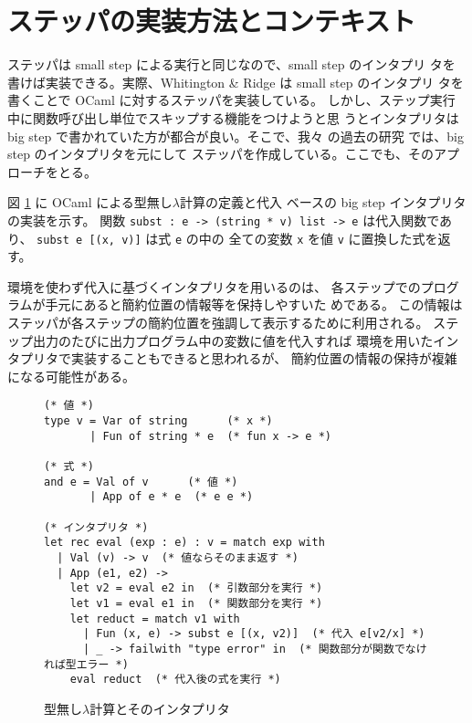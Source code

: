 \section{ステッパの実装方法とコンテキスト}
\label{section:context}

ステッパは small step による実行と同じなので、small step のインタプリ
タを書けば実装できる。実際、Whitington \& Ridge \cite{EPTCS294.3} は small step のインタプリ
タを書くことで OCaml に対するステッパを実装している。
しかし、ステップ実行中に関数呼び出し単位でスキップする機能をつけようと思
うとインタプリタは big step で書かれていた方が都合が良い。そこで、我々
の過去の研究 \cite{FCA19} では、big step のインタプリタを元にして
ステッパを作成している。ここでも、そのアプローチをとる。

図 \ref{figure:lambda} に OCaml による型無し$\lambda$計算の定義と代入
ベースの big step インタプリタの実装を示す。
関数 \texttt{subst :\ e -> (string * v) list -> e} は代入関数であり、
\texttt{subst e [(x, v)]} は式 \texttt{e} の中の
全ての変数 \texttt{x} を値 \texttt{v} に置換した式を返す。

環境を使わず代入に基づくインタプリタを用いるのは、
各ステップでのプログラムが手元にあると簡約位置の情報等を保持しやすいた
めである。
この情報はステッパが各ステップの簡約位置を強調して表示するために利用される。
ステップ出力のたびに出力プログラム中の変数に値を代入すれば
環境を用いたインタプリタで実装することもできると思われるが、
簡約位置の情報の保持が複雑になる可能性がある。


\begin{figure}
\begin{spacing}{0.9} 
\begin{verbatim}
(* 値 *)
type v = Var of string      (* x *)
       | Fun of string * e  (* fun x -> e *)

(* 式 *)
and e = Val of v      (* 値 *)
       | App of e * e  (* e e *)

(* インタプリタ *)
let rec eval (exp : e) : v = match exp with
  | Val (v) -> v  (* 値ならそのまま返す *)
  | App (e1, e2) ->
    let v2 = eval e2 in  (* 引数部分を実行 *)
    let v1 = eval e1 in  (* 関数部分を実行 *)
    let reduct = match v1 with
      | Fun (x, e) -> subst e [(x, v2)]  (* 代入 e[v2/x] *)
      | _ -> failwith "type error" in  (* 関数部分が関数でなければ型エラー *)
    eval reduct  (* 代入後の式を実行 *)
\end{verbatim}
\caption{型無し$\lambda$計算とそのインタプリタ}
\label{figure:lambda}
\end{spacing}
\end{figure}

